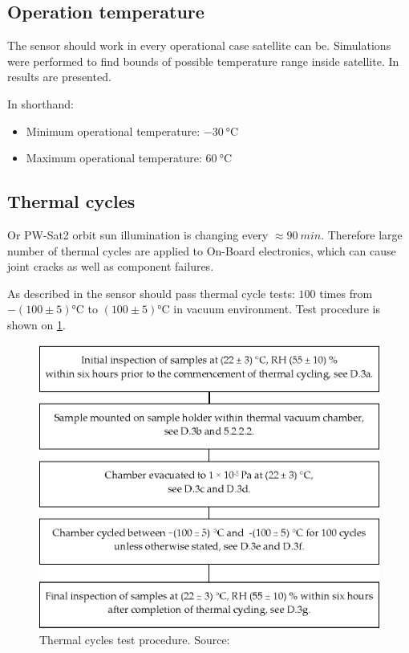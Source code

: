 \subsection{Operation temperature}
	The sensor should work in every operational case satellite can be. Simulations were performed to find bounds of possible temperature range inside satellite.	In \cite{PWSAT_TCS_CDR} results are presented. 
	
	In shorthand:
	\begin{itemize}
		\item Minimum operational temperature: $\SI{-30}{\degreeCelsius}$
		\item Maximum operational temperature: $\SI{60}{\degreeCelsius}$
	\end{itemize}


\subsection{Thermal cycles}
	Or PW-Sat2 orbit sun illumination is changing every $\approx \SI{90}{min}$. Therefore large number of thermal cycles are applied to On-Board electronics, which can cause joint cracks as well as component failures. 
	
	As described in \cite{ECSS_Q_ST_70_04C} the sensor should pass thermal cycle tests: $100$ times from $- (100 \pm 5)$\si{\degreeCelsius} to $(100 \pm 5)$\si{\degreeCelsius} in vacuum environment. Test procedure is shown on \ref{thermal_tests}.
	
	\begin{figure}[H]
		\centering
		\includegraphics[width=0.5\paperwidth]{img/thermal_cycles.eps}
		\caption{Thermal cycles test procedure. Source: \cite{ECSS_Q_ST_70_04C}}
		\label{thermal_tests}
	\end{figure}

